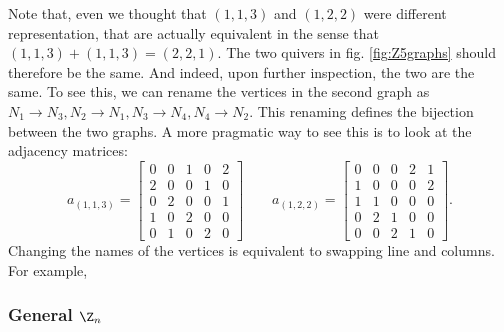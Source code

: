 \documentclass{worksheetclass}
\begin{document}
           Note that, even we thought that $(1,1,3)$ and $(1,2,2)$ were different representation, that are actually equivalent in the sense that $(1,1,3)+(1,1,3)=(2,2,1)$. The two quivers in fig. \ref{fig:Z5graphs} should therefore be the same. And indeed, upon further inspection, the two are the same. To see this, we can rename the vertices in the second graph as $N_1\to N_3,N_2\to N_1,N_3\to N_4,N_4\to N_2$. This renaming defines the bijection between the two graphs. A more pragmatic way to see this is to look at the adjacency matrices:
           \begin{equation}
                a_{(1,1,3)}=
                \begin{bmatrix}
                    0 & 0 & 1 & 0 & 2 \\
                    2 & 0 & 0 & 1 & 0 \\
                    0 & 2 & 0 & 0 & 1 \\
                    1 & 0 & 2 & 0 & 0 \\
                    0 & 1 & 0 & 2 & 0
                \end{bmatrix}\qquad
                a_{(1,2,2)}=
                \begin{bmatrix}
                    0 & 0 & 0 & 2 & 1 \\
                    1 & 0 & 0 & 0 & 2 \\
                    1 & 1 & 0 & 0 & 0 \\
                    0 & 2 & 1 & 0 & 0 \\
                    0 & 0 & 2 & 1 & 0
                \end{bmatrix}.
           \end{equation}
           Changing the names of the vertices is equivalent to swapping line and columns. For example, 

        \subsubsection{General $\Z_n$}
\end{document}
